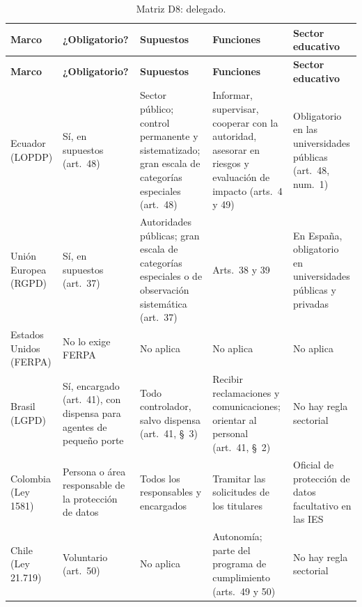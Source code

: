 {\scriptsize
\renewcommand{\arraystretch}{1.12}
\begin{xltabular}{\textwidth}{|>{\raggedright\arraybackslash}p{2.0cm}|L|L|L|L|}
  \caption{Matriz D8: delegado.}
  \label{tab:matriz_d8} \\
  \hline
  \textbf{Marco} & \textbf{¿Obligatorio?} & \textbf{Supuestos} & \textbf{Funciones} & \textbf{Sector educativo} \\
  \hline
  \endfirsthead
  \hline
  \textbf{Marco} & \textbf{¿Obligatorio?} & \textbf{Supuestos} & \textbf{Funciones} & \textbf{Sector educativo} \\
  \hline
  \endhead
  \hline
  \endlastfoot
  Ecuador (LOPDP) & Sí, en supuestos (art.~48) & Sector público; control permanente y sistematizado; gran escala de categorías especiales (art.~48) & Informar, supervisar, cooperar con la autoridad, asesorar en riesgos y evaluación de impacto (arts.~4 y 49) & Obligatorio en las universidades públicas (art.~48, num.~1) \\ \hline
  Unión Europea (RGPD) & Sí, en supuestos (art.~37) \cite{rgpd2016} & Autoridades públicas; gran escala de categorías especiales o de observación sistemática (art.~37) & Arts.~38 y 39 & En España, obligatorio en universidades públicas y privadas \cite[art.~34]{lopdgdd2018} \\ \hline
  Estados Unidos (FERPA) & No lo exige FERPA & No aplica & No aplica & No aplica \\ \hline
  Brasil (LGPD) & Sí, encargado (art.~41), con dispensa para agentes de pequeño porte \cite{brasil2018lgpd,anpd2022pequeno} & Todo controlador, salvo dispensa (art.~41, §~3) & Recibir reclamaciones y comunicaciones; orientar al personal (art.~41, §~2) & No hay regla sectorial \\ \hline
  Colombia (Ley 1581) & Persona o área responsable de la protección de datos \cite{colombia2013decreto1377} & Todos los responsables y encargados & Tramitar las solicitudes de los titulares & Oficial de protección de datos facultativo en las IES \cite{sic2026universitario} \\ \hline
  Chile (Ley 21.719) & Voluntario (art.~50) \cite{chile2024ley21719} & No aplica & Autonomía; parte del programa de cumplimiento (arts.~49 y 50) & No hay regla sectorial \\ \hline
\end{xltabular}
}

